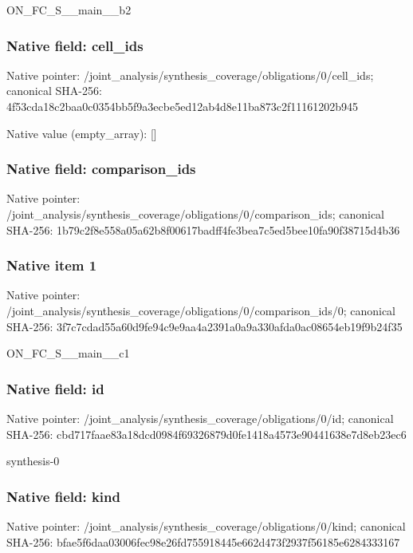 \documentclass[10pt,a4paper]{article}
\begin{document}
\begingroup\raggedright\sloppy ON\_\allowbreak{}FC\_\allowbreak{}S\_\allowbreak{}\_\allowbreak{}main\_\allowbreak{}\_\allowbreak{}b2\par\endgroup

\subsubsection{Native field: cell\_\allowbreak{}ids}
Native pointer: /joint\_\allowbreak{}analysis/synthesis\_\allowbreak{}coverage/obligations/0/cell\_\allowbreak{}ids; canonical SHA-256: 4f53cda18c2baa0c0354bb5f9a3ecbe5ed12ab4d8e11ba873c2f11161202b945

Native value (empty\_\allowbreak{}array): []

\subsubsection{Native field: comparison\_\allowbreak{}ids}
Native pointer: /joint\_\allowbreak{}analysis/synthesis\_\allowbreak{}coverage/obligations/0/comparison\_\allowbreak{}ids; canonical SHA-256: 1b79c2f8e558a05a62b8f00617badff4fe3bea7c5ed5bee10fa90f38715d4b36

\subsubsection{Native item 1}
Native pointer: /joint\_\allowbreak{}analysis/synthesis\_\allowbreak{}coverage/obligations/0/comparison\_\allowbreak{}ids/0; canonical SHA-256: 3f7c7cdad55a60d9fe94c9e9aa4a2391a0a9a330afda0ac08654eb19f9b24f35

\begingroup\raggedright\sloppy ON\_\allowbreak{}FC\_\allowbreak{}S\_\allowbreak{}\_\allowbreak{}main\_\allowbreak{}\_\allowbreak{}c1\par\endgroup

\subsubsection{Native field: id}
Native pointer: /joint\_\allowbreak{}analysis/synthesis\_\allowbreak{}coverage/obligations/0/id; canonical SHA-256: cbd717faae83a18dcd0984f69326879d0fe1418a4573e90441638e7d8eb23ec6

\begingroup\raggedright\sloppy synthesis-0\par\endgroup

\subsubsection{Native field: kind}
Native pointer: /joint\_\allowbreak{}analysis/synthesis\_\allowbreak{}coverage/obligations/0/kind; canonical SHA-256: bfae5f6daa03006fec98e26fd755918445e662d473f2937f56185e6284333167
\end{document}

